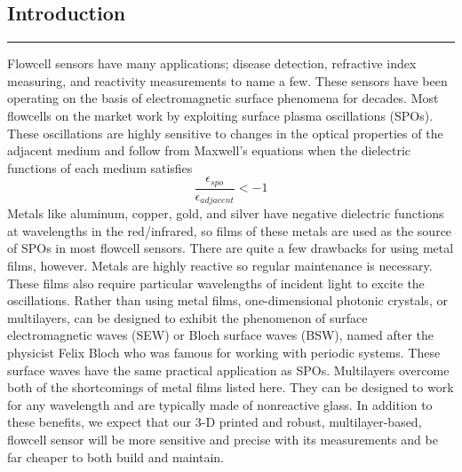 \documentclass{report}
\begin{document}
	\selectfont
	\begin{flushleft}
	\section*{Introduction}
	\vspace{-0.1cm}\hrule\vspace{0.2cm}
	\par{Flowcell sensors have many applications; disease detection, refractive index measuring, and reactivity measurements to name a few. These sensors have been operating on the basis of electromagnetic surface phenomena for decades. Most flowcells on the market work by exploiting surface plasma oscillations (SPOs). These oscillations are highly sensitive to changes in the optical properties of the adjacent medium and follow from Maxwell's equations when the dielectric functions of each medium satisfies 
	\[
		\frac{\epsilon_{spo}}{\epsilon_{adjacent}} < -1
	\]
	Metals like aluminum, copper, gold, and silver have negative dielectric functions at wavelengths in the red/infrared, so films of these metals are used as the source of SPOs in most flowcell sensors. There are quite a few drawbacks for using metal films, however. Metals are highly reactive so regular maintenance is necessary. These films also require particular wavelengths of incident light to excite the oscillations. Rather than using metal films, one-dimensional photonic crystals, or multilayers, can be designed to exhibit the phenomenon of surface electromagnetic waves (SEW) or Bloch surface waves (BSW), named after the physicist Felix Bloch who was famous for working with periodic systems. These surface waves have the same practical application as SPOs. Multilayers overcome both of the shortcomings of metal films listed here. They can be designed to work for any wavelength and are typically made of nonreactive glass. In addition to these benefits, we expect that our 3-D printed and robust, multilayer-based, flowcell sensor will be more sensitive and precise with its measurements and be far cheaper to both build and maintain.}

\end{flushleft}
\end{document}
